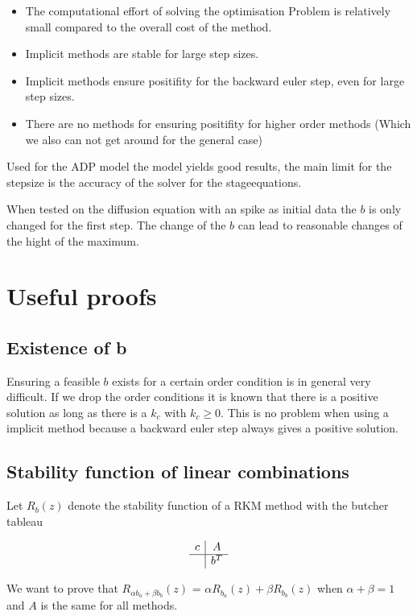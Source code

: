 \documentclass{article}
\begin{document}
\begin{itemize}
\item The computational effort of solving the optimisation Problem is relatively small compared to the overall cost of the method.
\item Implicit methods are stable for large step sizes.
\item Implicit methods ensure positifity for the backward euler step, even for large step sizes.
\item There are no methods for ensuring positifity for higher order methods (Which we also can not get around for the general case)
\end{itemize}

Used for the ADP model the model yields good results, the main limit for the stepsize is the accuracy of the solver for the stageequations.

When tested on the diffusion equation with an spike as initial data the $b$ is only changed for the first step. The change of the $b$ can lead to reasonable changes of the hight of the maximum. 



\section{Useful proofs}

\subsection{Existence of b}
Ensuring a feasible $b$ exists for a certain order condition is in general very difficult.
If we drop the order conditions it is known that there is a positive solution as long as there is a $k_c$ with $k_c \geq 0$.
This is no problem when using a implicit method because a backward euler step always gives a positive solution. 

\subsection{Stability function of linear combinations}\label{proof:combiningb}
Let $R_b(z)$ denote the stability function of a RKM method with the butcher tableau

$$
\begin{array}
{c|c}
c & A\\
\hline
& b^T
\end{array}
$$

We want to prove that $R_{\alpha b_a+\beta b_b}(z)$ = $\alpha R_{ b_a}(z)+\beta R_{b_b}(z)$ when $\alpha + \beta = 1$ and $A$ is the same for all methods.
\end{document}
